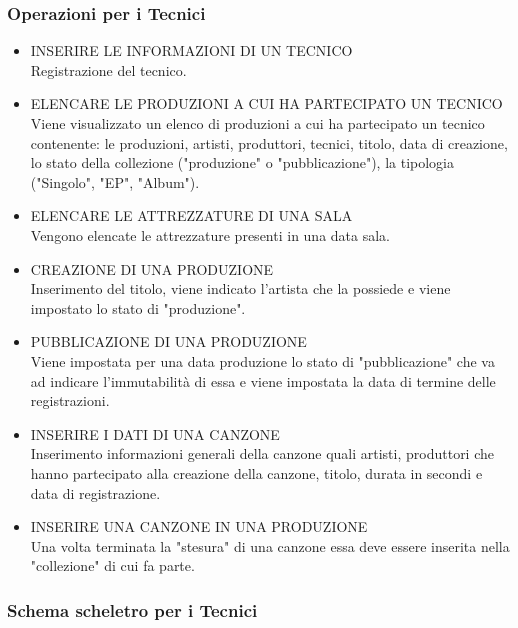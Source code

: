 \documentclass{article}
\newcounter{counteroperazioni}
\newcommand{\coperazioni}{\addtocounter{counteroperazioni}{1}\thecounteroperazioni}
\begin{document}
\subsubsection{Operazioni per i Tecnici}
\begin{itemize}[labelindent=1.5em,labelsep=.5cm,leftmargin=*]
    \item [\textbf{T\coperazioni)}] INSERIRE LE INFORMAZIONI DI UN TECNICO \\ Registrazione del tecnico.
    \item [\textbf{T\coperazioni)}] ELENCARE LE PRODUZIONI A CUI HA PARTECIPATO UN TECNICO \\ Viene visualizzato un elenco di produzioni a cui ha partecipato un tecnico contenente: le produzioni, artisti, produttori, tecnici, titolo, data di creazione, lo stato della collezione ("produzione" o "pubblicazione"), la tipologia ("Singolo", "EP", "Album").
    \item [\textbf{T\coperazioni)}] ELENCARE LE ATTREZZATURE DI UNA SALA \\ Vengono elencate le attrezzature presenti in una data sala.
    \item [\textbf{T\coperazioni)}] CREAZIONE DI UNA PRODUZIONE \\ Inserimento del titolo, viene indicato l'artista che la possiede e viene impostato lo stato di "produzione".
    \item [\textbf{T\coperazioni)}] PUBBLICAZIONE DI UNA PRODUZIONE \\ Viene impostata per una data produzione lo stato di "pubblicazione" che va ad indicare l'immutabilità di essa e viene impostata la data di termine delle registrazioni. 
    \item [\textbf{T\coperazioni)}] INSERIRE I DATI DI UNA CANZONE\\ Inserimento informazioni generali della canzone quali artisti, produttori che hanno partecipato alla creazione della canzone, titolo, durata in secondi e data di registrazione.
    \item [\textbf{T\coperazioni)}] INSERIRE UNA CANZONE IN UNA PRODUZIONE \\ Una volta terminata la "stesura" di una canzone essa deve essere inserita nella "collezione" di cui fa parte.
\end{itemize}

\subsubsection{Schema scheletro per i Tecnici}
\begin{center}
    
\end{center}
\end{document}

